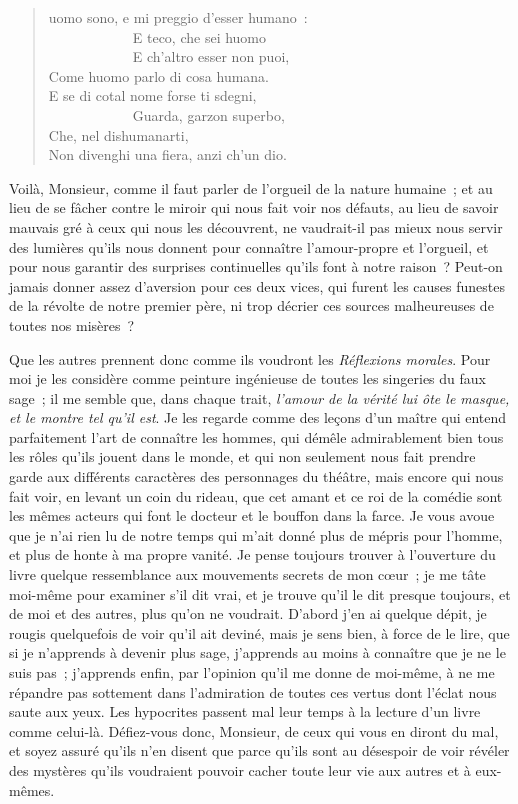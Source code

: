\documentclass[french,twoside]{book} %
\begin{document}
\begin{verse}
uomo sono, e mi preggio d’esser humano :\\
            E teco, che sei huomo\\
            E ch’altro esser non puoi,\\
Come huomo parlo di cosa humana.\\
E se di cotal nome forse ti sdegni,\\
            Guarda, garzon superbo,\\
Che, nel dishumanarti,\\
Non divenghi una fiera, anzi ch’un dio.\\
\end{verse}

\noindent Voilà, Monsieur, comme il faut parler de l’orgueil de la nature humaine ; et au lieu de se fâcher contre le miroir qui nous fait voir nos défauts, au lieu de savoir mauvais gré à ceux qui nous les découvrent, ne vaudrait-il pas mieux nous servir des lumières qu’ils nous donnent pour connaître l’amour-propre et l’orgueil, et pour nous garantir des surprises continuelles qu’ils font à notre raison ? Peut-on jamais donner assez d’aversion pour ces deux vices, qui furent les causes funestes de la révolte de notre premier père, ni trop décrier ces sources malheureuses de toutes nos misères ?\par
Que les autres prennent donc comme ils voudront les {\itshape Réflexions morales}. Pour moi je les considère comme peinture ingénieuse de toutes les singeries du faux sage ; il me semble que, dans chaque trait, {\itshape l’amour de la vérité lui ôte le masque, et le montre tel qu’il est}. Je les regarde comme des leçons d’un maître qui entend parfaitement l’art de connaître les hommes, qui démêle admirablement bien tous les rôles qu’ils jouent dans le monde, et qui non seulement nous fait prendre garde aux différents caractères des personnages du théâtre, mais encore qui nous fait voir, en levant un coin du rideau, que cet amant et ce roi de la comédie sont les mêmes acteurs qui font le docteur et le bouffon dans la farce. Je vous avoue que je n’ai rien lu de notre temps qui m’ait donné plus de mépris pour l’homme, et plus de honte à ma propre vanité. Je pense toujours trouver à l’ouverture du livre quelque ressemblance aux mouvements secrets de mon cœur ; je me tâte moi-même pour examiner s’il dit vrai, et je trouve qu’il le dit presque toujours, et de moi et des autres, plus qu’on ne voudrait. D’abord j’en ai quelque dépit, je rougis quelquefois de voir qu’il ait deviné, mais je sens bien, à force de le lire, que si je n’apprends à devenir plus sage, j’apprends au moins à connaître que je ne le suis pas ; j’apprends enfin, par l’opinion qu’il me donne de moi-même, à ne me répandre pas sottement dans l’admiration de toutes ces vertus dont l’éclat nous saute aux yeux. Les hypocrites passent mal leur temps à la lecture d’un livre comme celui-là. Défiez-vous donc, Monsieur, de ceux qui vous en diront du mal, et soyez assuré qu’ils n’en disent que parce qu’ils sont au désespoir de voir révéler des mystères qu’ils voudraient pouvoir cacher toute leur vie aux autres et à eux-mêmes.\par
\end{document}
